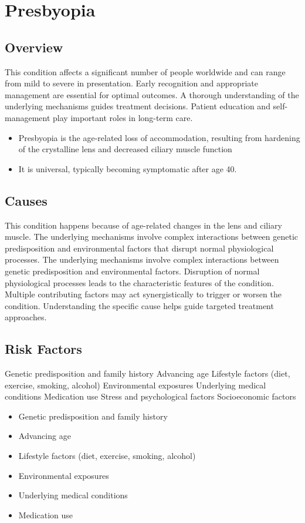 \chapter{Presbyopia}
\label{sec:Presbyopia}

\section{Overview}
This condition affects a significant number of people worldwide and can range from mild to severe in presentation. Early recognition and appropriate management are essential for optimal outcomes. A thorough understanding of the underlying mechanisms guides treatment decisions. Patient education and self-management play important roles in long-term care.

\begin{itemize}[noitemsep]
  \item Presbyopia is the age-related loss of accommodation, resulting from hardening of the crystalline lens and decreased ciliary muscle function
  \item It is universal, typically becoming symptomatic after age 40.
\end{itemize}
\section{Causes}
This condition happens because of age-related changes in the lens and ciliary muscle. The underlying mechanisms involve complex interactions between genetic predisposition and environmental factors that disrupt normal physiological processes. The underlying mechanisms involve complex interactions between genetic predisposition and environmental factors. Disruption of normal physiological processes leads to the characteristic features of the condition. Multiple contributing factors may act synergistically to trigger or worsen the condition. Understanding the specific cause helps guide targeted treatment approaches.
\section{Risk Factors}
Genetic predisposition and family history Advancing age Lifestyle factors (diet, exercise, smoking, alcohol) Environmental exposures Underlying medical conditions Medication use Stress and psychological factors Socioeconomic factors

\begin{itemize}[noitemsep]
  \item Genetic predisposition and family history
  \item Advancing age
  \item Lifestyle factors (diet, exercise, smoking, alcohol)
  \item Environmental exposures
  \item Underlying medical conditions
  \item Medication use
\end{itemize}
